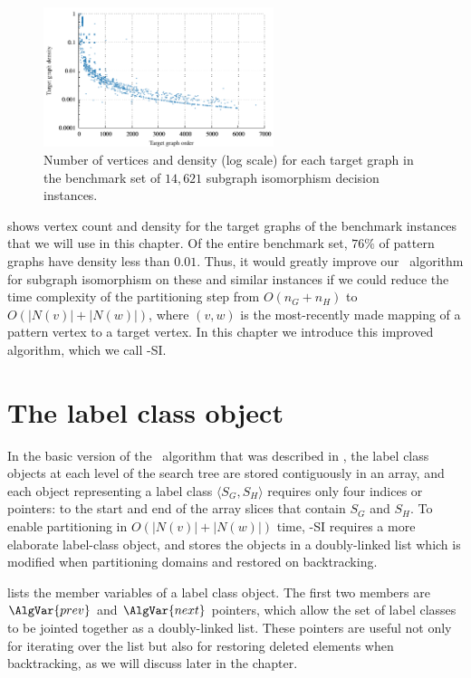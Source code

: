 \begin{figure}[htb]
    \centering
    \includegraphics*[width=0.6\textwidth]{14b-mcsplit-induced-si/density-chart/plots/n-density-pdf}
    \caption{Number of vertices and density (log scale) for each target graph in the benchmark set
    of $14,621$ subgraph isomorphism decision instances.}
    \label{figure:si-targets-n-density}
\end{figure}

 shows vertex count and density for the target graphs of the benchmark instances
that we will use in this chapter.  Of the entire benchmark set, $76\%$ of pattern graphs have density less than $0.01$.  Thus, it would
greatly improve our \McSplit\ algorithm for subgraph isomorphism on these and similar instances if we could reduce the time complexity of the partitioning
step from $O(n_G + n_H)$ to $O(|N(v)| + |N(w)|)$, where $(v,w)$ is the most-recently made mapping of a pattern vertex to a target
vertex.  In this chapter we introduce this improved algorithm, which we call \McSplit-SI.

\FloatBarrier

\section{The label class object}

In the basic version of the \McSplit\ algorithm that was described in
, the label class objects at each level of the search tree are stored
contiguously in an array, and each object representing
a label class $\langle S_G, S_H \rangle$ requires only four indices or pointers: to the start and
end of the array slices that contain $S_G$ and $S_H$.
To enable partitioning in $O(|N(v)| + |N(w)|)$ time, \McSplit-SI
requires a more elaborate label-class object, and stores the objects in a doubly-linked list which is modified
when partitioning domains and restored on backtracking.

 lists the member variables of a label class object.
The first two members are $\AlgVar{prev}$ and $\AlgVar{next}$ pointers, which
allow the set of label classes to be jointed together as a doubly-linked list.
These pointers are useful not only for iterating over the list but also
for restoring deleted elements when backtracking, as we will discuss later in the chapter.

